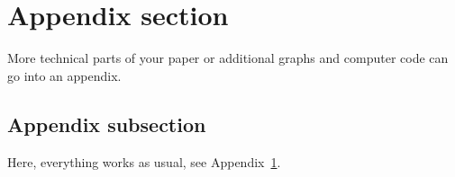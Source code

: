 \documentclass[aodsor,preprint]{imsart}
\numberwithin{equation}{section}
\theoremstyle{plain}
\begin{document}

\appendix


\section{Appendix section}
\label{sec:app}

More technical parts of your paper or additional graphs and computer code can go into an appendix.

\subsection{Appendix subsection}

Here, everything works as usual, see Appendix~\ref{sec:app}.





{}
\end{document}
